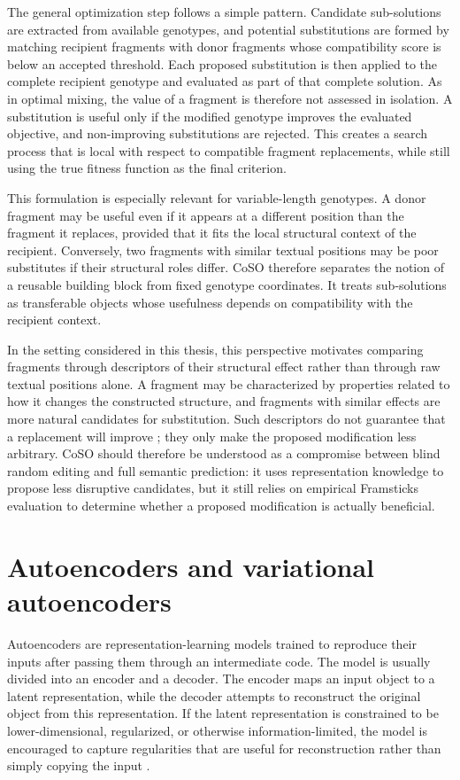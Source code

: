 The general optimization step follows a simple pattern. Candidate sub-solutions are extracted from available genotypes, and potential substitutions are formed by matching recipient fragments with donor fragments whose compatibility score is below an accepted threshold. Each proposed substitution is then applied to the complete recipient genotype and evaluated as part of that complete solution. As in optimal mixing, the value of a fragment is therefore not assessed in isolation. A substitution is useful only if the modified genotype improves the evaluated objective, and non-improving substitutions are rejected. This creates a search process that is local with respect to compatible fragment replacements, while still using the true fitness function as the final criterion.

This formulation is especially relevant for variable-length genotypes. A donor fragment may be useful even if it appears at a different position than the fragment it replaces, provided that it fits the local structural context of the recipient. Conversely, two fragments with similar textual positions may be poor substitutes if their structural roles differ. CoSO therefore separates the notion of a reusable building block from fixed genotype coordinates. It treats sub-solutions as transferable objects whose usefulness depends on compatibility with the recipient context.

In the \fone{} setting considered in this thesis, this perspective motivates comparing fragments through descriptors of their structural effect rather than through raw textual positions alone. A fragment may be characterized by properties related to how it changes the constructed structure, and fragments with similar effects are more natural candidates for substitution. Such descriptors do not guarantee that a replacement will improve \vertpos{}; they only make the proposed modification less arbitrary. CoSO should therefore be understood as a compromise between blind random editing and full semantic prediction: it uses representation knowledge to propose less disruptive candidates, but it still relies on empirical Framsticks evaluation to determine whether a proposed modification is actually beneficial.

\section{Autoencoders and variational autoencoders}

Autoencoders are representation-learning models trained to reproduce their inputs after passing them through an intermediate code. The model is usually divided into an encoder and a decoder. The encoder maps an input object to a latent representation, while the decoder attempts to reconstruct the original object from this representation. If the latent representation is constrained to be lower-dimensional, regularized, or otherwise information-limited, the model is encouraged to capture regularities that are useful for reconstruction rather than simply copying the input \cite{Rumelhart1986,HintonSalakhutdinov2006}.


